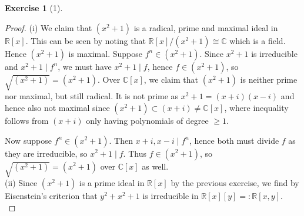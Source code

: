 \documentclass[reqno]{amsart}
\theoremstyle{definition}
\newtheorem{exercise}[theorem]{Exercise}
\theoremstyle{remark}
\begin{document}
    \begin{exercise}[1]
        \begin{proof}
            (i)
                We claim that 
                    $\left( x^2+1 \right) $ is a radical,
                    prime and maximal
                    ideal in $\mathbb{R}\left[ x \right] $.
                    This can be seen
                    by noting that
                    $\mathbb{R}\left[ x \right] /
                    \left( x^2 +1 \right) \cong \mathbb{C}$ which
                    is a field. Hence
                    $\left( x^2+1 \right) $ is
                    maximal. Suppose
                    $f^{n} \in \left( x^2+1 \right) $.
                    Since $x^2 +1$ is irreducible
                    and $x^2 +1  \mid f^{n}$, we must
                    have $x^2 + 1  \mid f$, hence
                    $f \in \left( x^2 +1 \right) $,
                    so $\sqrt{\left( x^2+1 \right) } 
                    =\left( x^2 +1 \right) $.
                Over $\mathbb{C}\left[ x \right] $,
                    we claim that
                    $\left( x^2+1 \right) $ is neither
                    prime nor maximal, but still radical.
                    It is not prime as
                    $x^2+1 = \left( x+i \right) \left( x-i \right) $
                    and hence also not maximal
                    since $\left( x^2+1 \right) 
                    \subset \left( x+i \right) \neq 
                    \mathbb{C}[x]$, where
                    inequality follows from 
                    $\left( x+i \right) $ only
                    having polynomials of degree $\ge 1$.

                    Now suppose
                    $f^{n} \in \left( x^2+1 \right) $.
                    Then $x+i, x-i  \mid f^{n}$, hence
                    both must divide $f$ as they are
                    irreducible, so
                    $x^2 +1  \mid f$. Thus
                    $f \in \left( x^2+1 \right) $, so
                    $\sqrt{\left( x^2+1 \right) } 
                    = \left( x^2+1 \right)  $ over
                    $\mathbb{C}\left[ x \right] $
                    as well.\\
                    \linebreak
                    (ii) Since $\left( x^2 +1 \right) $  is
                    a prime ideal in $
                    \mathbb{R}[x]$ by the previous exercise,
                    we find by Eisenstein's criterion that
                    $y^2 + x^2 + 1$ is irreducible
                    in $\mathbb{R}[x][y] =:
                    \mathbb{R}[x,y]$.\\
                    \linebreak
                    


\end{proof}
\end{exercise}
\end{document}

